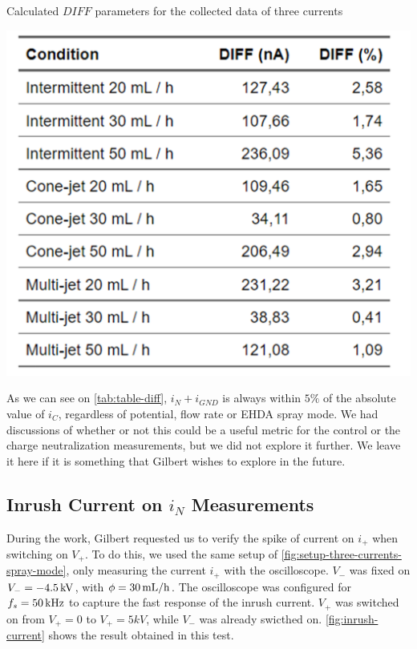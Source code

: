 \documentclass[oneside,12pt]{article}
\begin{document}
\begin{table}[h!]
    \begin{center}
        \caption{Calculated $DIFF$ parameters for the collected data of three currents}
        \includegraphics[width=.6\textwidth,trim=1 1 1 1,clip]{figures/table-diff.png}
        \label{tab:table-diff}
    \end{center}
  \end{table}

As we can see on \autoref{tab:table-diff}, $i_N + i_{GND}$ is always within $5\%$ of the absolute value of $i_C$, regardless of potential,
flow rate or EHDA spray mode. We had discussions of whether 
or not this could be a useful metric for the control or the charge neutralization measurements, but we did not explore it further. We leave it here 
if it is something that Gilbert wishes to explore in the future. 

\subsection{Inrush Current on $i_N$ Measurements}

During the work, Gilbert requested us to verify the spike of current on $i_+$ when switching on $V_+$. To do this, we used the same setup 
of \autoref{fig:setup-three-currents-spray-mode}, only measuring the current $i_+$ with the oscilloscope. $V_-$ was fixed on $V_- = - 4.5 \,\mathrm{kV}$, 
with $\phi = 30 \,\mathrm{mL/h}$. The oscilloscope was configured for $f_s = 50 \,\mathrm{kHz}$ to capture the fast response of the inrush current.
$V_+$ was switched on from $V_+ = 0$ to $V_+ = 5 kV$, while $V_-$ was already swicthed on. \autoref{fig:inrush-current} shows the result 
obtained in this test.
\end{document}
